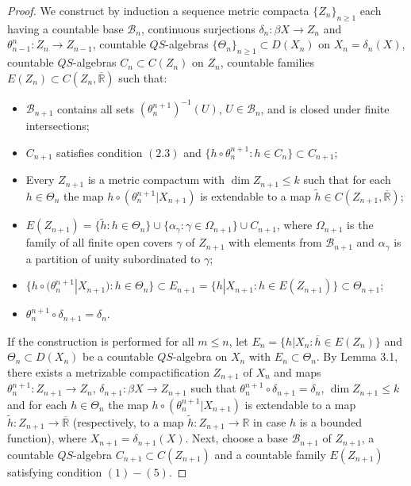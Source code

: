 \documentclass[12pt]{amsart}
\begin{document}
\begin{proof}
We construct by induction a sequence metric compacta $\{Z_n\}_{n\geq 1}$ each having a countable base $\mathcal B_n$, continuous surjections $\delta_n:\beta X\to Z_n$ and $\theta^n_{n-1}:Z_n\to Z_{n-1}$, countable 
$QS$-algebras $\{\Theta_{n}\}_{n\geq 1}\subset D(X_{n})$ on $X_{n}=\delta_{n}(X)$, countable $QS$-algebras $C_n\subset C(Z_n)$ on $Z_n$, countable families 
$E(Z_n)\subset C(Z_n,\overline{\mathbb R})$ such that:
\begin{itemize}
\item[(1)] $\mathcal B_{n+1}$ contains all sets $(\theta^{n+1}_{n})^{-1}(U)$, $U\in\mathcal B_{n}$, and is closed under finite intersections;
\item[(2)] $C_{n+1}$ satisfies condition $(2.3)$ and $\{h\circ\theta^{n+1}_{n}:h\in C_{n}\}\subset C_{n+1}$;
\item[(3)] Every $Z_{n+1}$ is a metric compactum with $\dim Z_{n+1}\leq k$ such that for each $h\in\Theta_{n}$ the map $h\circ(\theta^{n+1}_{n}|X_{n+1})$ is extendable to a map $\widetilde h\in C(Z_{n+1},\overline{\mathbb R})$;
\item[(4)] $E(Z_{n+1})=\{\widetilde h:h\in\Theta_{n}\}\cup\{\alpha_\gamma:\gamma\in\Omega_{n+1}\}\cup C_{n+1}$, where $\Omega_{n+1}$ is the family of all finite open covers $\gamma$ of $Z_{n+1}$ with elements from $\mathcal B_{n+1}$ and $\alpha_\gamma$ is a partition of unity subordinated to $\gamma$;
\item[(5)] $\{h\circ(\theta^{n+1}_n|X_{n+1}):h\in\Theta_n\}\subset E_{n+1}=\{h|X_{n+1}:h\in E(Z_{n+1})\}\subset\Theta_{n+1}$;
\item[(6)] $\theta^{n+1}_{n}\circ\delta_{n+1}=\delta_{n}$.        
\end{itemize}
If the construction is performed for all $m\leq n$, let $E_n=\{h|X_n:\overline h\in E(Z_n)\}$ and $\Theta_{n}\subset D(X_n)$ be a countable $QS$-algebra on $X_n$ with $E_n\subset\Theta_{n}$. 
By Lemma 3.1, there exists a metrizable compactification $Z_{n+1}$ of $X_n$ and maps $\theta^{n+1}_n:Z_{n+1}\to Z_n$, $\delta_{n+1}:\beta X\to Z_{n+1}$ such that $\theta^{n+1}_{n}\circ\delta_{n+1}=\delta_{n}$,
$\dim Z_{n+1}\leq k$ and for each $h\in\Theta_{n}$ the map $h\circ(\theta^{n+1}_n|X_{n+1})$ is extendable to a map $\widetilde h:Z_{n+1}\to\overline{\mathbb R}$ (respectively, to a map  
$\widetilde h:Z_{n+1}\to\mathbb R$ in case $h$ is a bounded function), where $X_{n+1}=\delta_{n+1}(X)$.
Next, choose a base $\mathcal B_{n+1}$ of $Z_{n+1}$, a countable $QS$-algebra $C_{n+1}\subset C(Z_{n+1})$ and a countable family $E(Z_{n+1})$ satisfying condition $(1)-(5)$. 




\end{proof}
\end{document}
